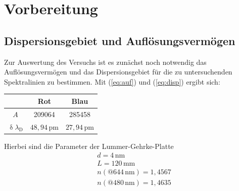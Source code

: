 \section{Vorbereitung}
\subsection{Dispersionsgebiet und Auflösungsvermögen}
\label{sec:dispersion}
Zur Auswertung des Versuchs ist es zunächst noch notwendig das Auflösungsvermögen und das Dispersionsgebiet für die zu untersuchenden Spektralinien zu bestimmen. Mit (\ref{eq:auf}) und
(\ref{eq:disp}) ergibt sich:
\begin{table}[]
\centering
\begin{tabular}{c|cc}
 & Rot  & Blau\\
 \hline
$A$ & 209064  & 285458 \\
$\updelta \lambda_\text{D}$ & $48{,}94\,\si{\pico\meter}$ &$27{,}94\,\si{\pico\meter}$
\end{tabular}
\end{table}
Hierbei sind die Parameter der Lummer-Gehrke-Platte
\begin{align}
&d=4\,\si{\nm}\nonumber\\
&L=120\,\si{\mm}\nonumber\\
&n\left(@644\,\si{\nm}\right)=1{,}4567\nonumber\\
&n\left(@480\,\si{\nm}\right)=1{,}4635\nonumber
\end{align}
